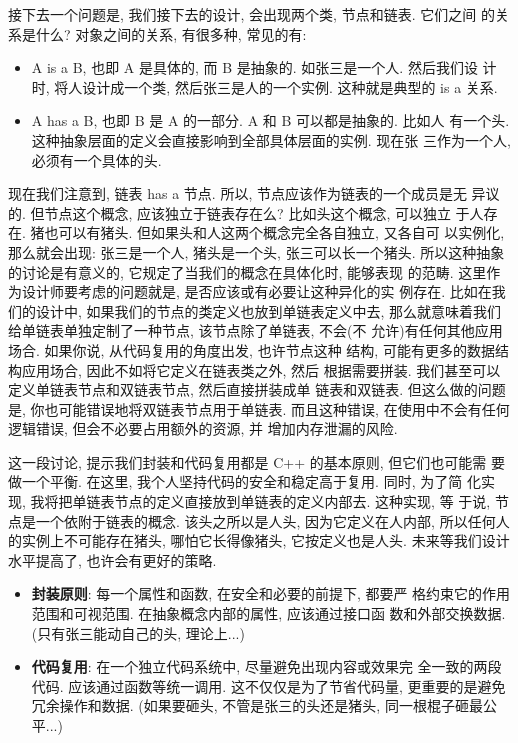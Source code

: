 \documentclass[a4paper]{ctexart}
\theoremstyle{definition}
\theoremstyle{definition}
\begin{document}
接下去一个问题是, 我们接下去的设计, 会出现两个类, 节点和链表. 它们之间
的关系是什么? 对象之间的关系, 有很多种, 常见的有:
\begin{itemize}
  \item A is a B, 也即 A 是具体的, 而 B 是抽象的. 如张三是一个人. 然后我们设
  计时, 将人设计成一个类, 然后张三是人的一个实例. 这种就是典型的 is a 关系.
  \item A has a B, 也即 B 是 A 的一部分. A 和 B 可以都是抽象的. 比如人
    有一个头. 这种抽象层面的定义会直接影响到全部具体层面的实例. 现在张
    三作为一个人, 必须有一个具体的头. 
\end{itemize}
现在我们注意到, 链表 has a 节点. 所以, 节点应该作为链表的一个成员是无
异议的. 但节点这个概念, 应该独立于链表存在么? 比如头这个概念, 可以独立
于人存在. 猪也可以有猪头. 但如果头和人这两个概念完全各自独立, 又各自可
以实例化, 那么就会出现: 张三是一个人, 猪头是一个头, 张三可以长一个猪头.
所以这种抽象的讨论是有意义的, 它规定了当我们的概念在具体化时, 能够表现
的范畴. 这里作为设计师要考虑的问题就是, 是否应该或有必要让这种异化的实
例存在. 比如在我们的设计中, 如果我们的节点的类定义也放到单链表定义中去,
那么就意味着我们给单链表单独定制了一种节点, 该节点除了单链表, 不会(不
允许)有任何其他应用场合. 如果你说, 从代码复用的角度出发, 也许节点这种
结构, 可能有更多的数据结构应用场合, 因此不如将它定义在链表类之外, 然后
根据需要拼装. 我们甚至可以定义单链表节点和双链表节点, 然后直接拼装成单
链表和双链表. 但这么做的问题是, 你也可能错误地将双链表节点用于单链表.
而且这种错误, 在使用中不会有任何逻辑错误, 但会不必要占用额外的资源, 并
增加内存泄漏的风险.

这一段讨论, 提示我们封装和代码复用都是 C++ 的基本原则, 但它们也可能需
要做一个平衡. 在这里, 我个人坚持代码的安全和稳定高于复用. 同时, 为了简
化实现, 我将把单链表节点的定义直接放到单链表的定义内部去. 这种实现, 等
于说, 节点是一个依附于链表的概念. 该头之所以是人头, 因为它定义在人内部,
所以任何人的实例上不可能存在猪头, 哪怕它长得像猪头, 它按定义也是人头.
未来等我们设计水平提高了, 也许会有更好的策略.

\begin{itemize}
  \item {\bf 封装原则}: 每一个属性和函数, 在安全和必要的前提下, 都要严
    格约束它的作用范围和可视范围. 在抽象概念内部的属性, 应该通过接口函
    数和外部交换数据. (只有张三能动自己的头, 理论上...)
  \item {\bf 代码复用}: 在一个独立代码系统中, 尽量避免出现内容或效果完
    全一致的两段代码. 应该通过函数等统一调用. 这不仅仅是为了节省代码量,
    更重要的是避免冗余操作和数据. (如果要砸头, 不管是张三的头还是猪头,
    同一根棍子砸最公平...)
\end{itemize}
\end{document}

